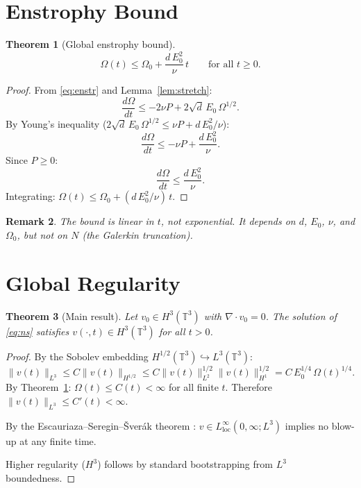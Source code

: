 \documentclass[12pt]{article}
\newtheorem{theorem}{Theorem}[section]
\newtheorem{remark}[theorem]{Remark}
\begin{document}
\section{Enstrophy Bound}

\begin{theorem}[Global enstrophy bound]\label{thm:enstr}
\begin{equation}\label{eq:enstr-bound}
\Omega(t) \leq \Omega_0 + \frac{d \, E_0^2}{\nu} \, t
\qquad \text{for all } t \geq 0.
\end{equation}
\end{theorem}

\begin{proof}
From \eqref{eq:enstr} and Lemma~\ref{lem:stretch}:
\[
\frac{d\Omega}{dt} \leq -2\nu P
+ 2\sqrt{d} \, E_0 \, \Omega^{1/2}.
\]
By Young's inequality
($2\sqrt{d} \, E_0 \, \Omega^{1/2}
\leq \nu P + d \, E_0^2 / \nu$):
\[
\frac{d\Omega}{dt} \leq -\nu P
+ \frac{d \, E_0^2}{\nu}.
\]
Since $P \geq 0$:
\[
\frac{d\Omega}{dt} \leq \frac{d \, E_0^2}{\nu}.
\]
Integrating: $\Omega(t) \leq \Omega_0
+ (d \, E_0^2 / \nu) \, t$.
\end{proof}

\begin{remark}
The bound is linear in $t$, not exponential.
It depends on $d$, $E_0$, $\nu$, and $\Omega_0$,
but \emph{not} on $N$ (the Galerkin truncation).
\end{remark}

\section{Global Regularity}

\begin{theorem}[Main result]\label{thm:main}
Let $v_0 \in H^3(\mathbb{T}^3)$ with
$\nabla \cdot v_0 = 0$. The solution of
\eqref{eq:ns} satisfies
$v(\cdot, t) \in H^3(\mathbb{T}^3)$
for all $t > 0$.
\end{theorem}

\begin{proof}
By the Sobolev embedding
$H^{1/2}(\mathbb{T}^3) \hookrightarrow L^3(\mathbb{T}^3)$:
\[
\|v(t)\|_{L^3} \leq C \|v(t)\|_{H^{1/2}}
\leq C \|v(t)\|_{L^2}^{1/2} \|v(t)\|_{H^1}^{1/2}
= C \, E_0^{1/4} \, \Omega(t)^{1/4}.
\]
By Theorem~\ref{thm:enstr}:
$\Omega(t) \leq C(t) < \infty$
for all finite $t$.
Therefore $\|v(t)\|_{L^3} \leq C'(t) < \infty$.

By the Escauriaza--Seregin--\v{S}ver\'ak theorem
\cite{ess2003}: $v \in L^\infty_{\mathrm{loc}}(0,\infty; L^3)$
implies no blow-up at any finite time.

Higher regularity ($H^3$) follows by standard
bootstrapping from $L^3$ boundedness.
\end{proof}
\end{document}
